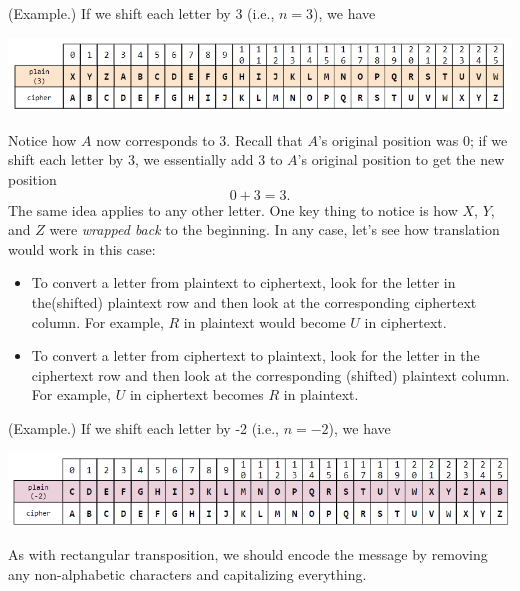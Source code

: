 \documentclass[letterpaper]{article}
\begin{document}
\begin{mdframed}
    (Example.) If we shift each letter by 3 (i.e., $n = 3$), we have 
    \begin{center}
        \includegraphics[scale=0.7]{assets/ceasar_2.png}
    \end{center}
    Notice how $A$ now corresponds to 3. Recall that $A$'s original position was 0; if we shift each letter by 3, we essentially add 3 to $A$'s original position to get the new position 
    \[0 + 3 = 3.\]
    The same idea applies to any other letter. One key thing to notice is how $X$, $Y$, and $Z$ were \emph{wrapped back} to the beginning. In any case, let's see how translation would work in this case: 
    \begin{itemize}
        \item To convert a letter from plaintext to ciphertext, look for the letter in the(shifted) plaintext row and then look at the corresponding ciphertext column. For example, $R$ in plaintext would become $U$ in ciphertext. 
        \item To convert a letter from ciphertext to plaintext, look for the letter in the ciphertext row and then look at the corresponding (shifted) plaintext column. For example, $U$ in ciphertext becomes $R$ in plaintext. 
    \end{itemize}
\end{mdframed}

\begin{mdframed}
    (Example.) If we shift each letter by -2 (i.e., $n = -2$), we have 
    \begin{center}
        \includegraphics[scale=0.7]{assets/ceasar_3.png}
    \end{center}
\end{mdframed}

As with rectangular transposition, we should encode the message by removing any non-alphabetic characters and capitalizing everything. 
\end{document}
